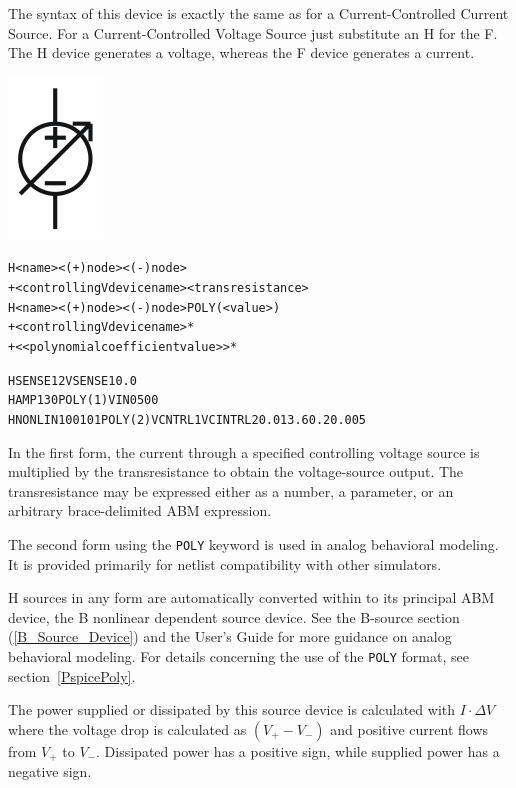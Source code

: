 


The syntax of this device is exactly the same as for a Current-Controlled
Current Source.  For a Current-Controlled Voltage Source just substitute an H
for the F. The H device generates a voltage, whereas the F device generates a
current.

\begin{Device}

\symbol
{\includegraphics{ccvsSymbol}}

\device
\begin{alltt}
H<name> <(+) node> <(-) node>
+ <controlling V device name> <transresistance>
H<name> <(+) node> <(-) node> POLY(<value>)
+ <controlling V device name>*
+ < <polynomial coefficient value> >*
\end{alltt}

\examples
\begin{alltt}
HSENSE 1 2 VSENSE 10.0
HAMP 13 0 POLY(1) VIN 0 500
HNONLIN 100 101 POLY(2) VCNTRL1 VCINTRL2 0.0 13.6 0.2 0.005
\end{alltt}

\comments

In the first form, the current through a specified controlling voltage
source is multiplied by the transresistance to obtain the
voltage-source output.  The transresistance may be expressed either as
a number, a parameter, or an arbitrary brace-delimited ABM expression.

The second form using the \texttt{POLY} keyword is used in analog
behavioral modeling.  It is provided primarily for netlist
compatibility with other simulators.

H sources in any form are automatically converted within \Xyce{} to
its principal ABM device, the B nonlinear dependent source device. See
the B-source section (\ref{B_Source_Device}) and the \Xyce{} User's
Guide for more guidance on analog behavioral modeling.  For details
concerning the use of the \texttt{POLY} format, see
section~\ref{PspicePoly}.

The power supplied or dissipated by this source device is calculated
with $I \cdot \Delta V$ where the voltage drop is calculated as $(V_+ - V_-)$
and positive current flows from $V_+$ to $V_-$.  Dissipated power has a
positive sign, while supplied power has a negative sign.

\end{Device}
